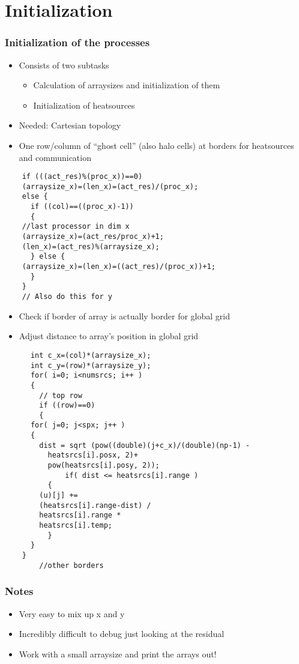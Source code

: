 \section{Initialization}
\begin{frame}
  \frametitle{Initialization of the processes}
  \begin{itemize}
  \item Consists of two subtasks
    \begin{itemize}
    \item Calculation of arraysizes and initialization of them
    \item Initialization of heatsources
    \end{itemize}
    \item Needed: Cartesian topology
    \item One row/column of ``ghost cell'' (also halo cells) at borders for heatsources and communication
  \end{itemize}
\end{frame}


\begin{frame}[fragile]
  \begin{lstlisting}
    if (((act_res)%(proc_x))==0)
    (arraysize_x)=(len_x)=(act_res)/(proc_x);
    else {
      if ((col)==((proc_x)-1))
      {
	//last processor in dim x
	(arraysize_x)=(act_res/proc_x)+1;
	(len_x)=(act_res)%(arraysize_x);
      } else {
	(arraysize_x)=(len_x)=((act_res)/(proc_x))+1; 
      }
    }    
    // Also do this for y
  \end{lstlisting}


\end{frame}



\begin{frame}
  \begin{itemize}
  \item Check if border of array is actually border for global grid
    \item Adjust distance to array's position in global grid
  \end{itemize}
\end{frame}




\begin{frame}[fragile]
  \begin{lstlisting}
      int c_x=(col)*(arraysize_x);
      int c_y=(row)*(arraysize_y);
      for( i=0; i<numsrcs; i++ )
      {
        // top row 
        if ((row)==0)
        {
	  for( j=0; j<spx; j++ ) 
	  { 
	    dist = sqrt (pow((double)(j+c_x)/(double)(np-1) -
	      heatsrcs[i].posx, 2)+
	      pow(heatsrcs[i].posy, 2));
              if( dist <= heatsrcs[i].range )
	      {
		(u)[j] += 
		(heatsrcs[i].range-dist) /
		heatsrcs[i].range *
		heatsrcs[i].temp;
	      }
	  }
	}
        //other borders
  \end{lstlisting}
\end{frame}

\begin{frame}
  \frametitle{Notes}
  \begin{itemize}
  \item Very easy to mix up x and y
  \item Incredibly difficult to debug just looking at the residual
  \item Work with a small arraysize and print the arrays out!
  \end{itemize}
\end{frame}
